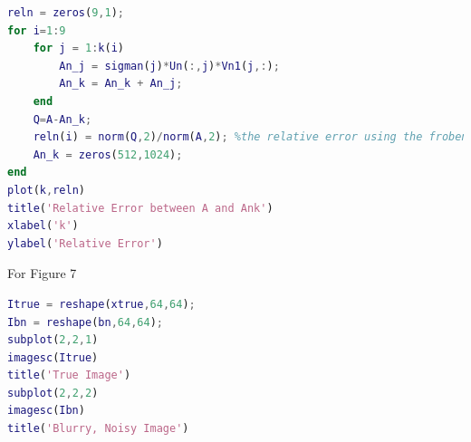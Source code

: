 \documentclass[answers,10pt]{exam}
\begin{document}
\begin{questions}
\begin{solution}
\begin{lstlisting}[language = Matlab]
reln = zeros(9,1);
for i=1:9
    for j = 1:k(i)
        An_j = sigman(j)*Un(:,j)*Vn1(j,:);
        An_k = An_k + An_j;
    end
    Q=A-An_k;
    reln(i) = norm(Q,2)/norm(A,2); %the relative error using the frobenius norm
    An_k = zeros(512,1024);
end
plot(k,reln)
title('Relative Error between A and Ank')
xlabel('k')
ylabel('Relative Error')
\end{lstlisting}
$$ $$
For Figure 7
\begin{lstlisting}[language = Matlab]
%Clean Image and Blurry,Noisy Image
Itrue = reshape(xtrue,64,64);
Ibn = reshape(bn,64,64);
subplot(2,2,1)
imagesc(Itrue)
title('True Image')
subplot(2,2,2)
imagesc(Ibn)
title('Blurry, Noisy Image')
\end{lstlisting}


\end{solution}

\end{questions}
\end{document}
